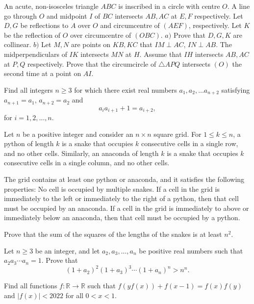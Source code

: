 \documentclass[11pt]{scrartcl}
\begin{document}
\begin{problem}[796349431725149]
An acute, non-isosceles triangle $ABC$ is inscribed in a circle with centre $O$. A line go through $O$ and midpoint $I$ of $BC$ intersects $AB, AC$ at $E, F$ respectively. Let $D, G$ be reflections to $A$ over $O$ and circumcentre of $(AEF)$, respectively. Let $K$ be the reflection of $O$ over circumcentre of $(OBC)$.
$a)$ Prove that $D, G, K$ are collinear.
$b)$ Let $M, N$ are points on $KB, KC$ that $IM\perp AC$, $IN\perp AB$. The midperpendiculars of $IK$ intersects $MN$ at $H$. Assume that $IH$ intersects $AB, AC$ at $P, Q$ respectively. Prove that the circumcircle of $\triangle APQ$ intersects $(O)$ the second time at a point on $AI$.
\end{problem}
\begin{problem}[574223786384294]
Find all integers $n \geq 3$ for which there exist real numbers $a_1, a_2, \dots a_{n + 2}$ satisfying $a_{n + 1} = a_1$, $a_{n + 2} = a_2$ and
$$a_ia_{i + 1} + 1 = a_{i + 2},$$for $i = 1, 2, \dots, n$.
\end{problem}
\begin{problem}[8592236630142322398]
	Let \(n\) be a positive integer and consider an \(n\times n\) square grid. For \(1\le k\le n\), a python of length \(k\) is a snake that occupies \(k\) consecutive cells in a single row, and no other cells. Similarly, an anaconda of length \(k\) is a snake that occupies \(k\) consecutive cells in a single column, and no other cells.

The grid contains at least one python or anaconda, and it satisfies the following properties:
No cell is occupied by multiple snakes.
If a cell in the grid is immediately to the left or immediately to the right of a python, then that cell must be occupied by an anaconda.
If a cell in the grid is immediately to above or immediately below an anaconda, then that cell must be occupied by a python.

Prove that the sum of the squares of the lengths of the snakes is at least \(n^2\).
\end{problem}
\begin{problem}[920619320023657807]
Let $n\ge 3$ be an integer, and let $a_2,a_3,\ldots ,a_n$ be positive real numbers such that $a_{2}a_{3}\cdots a_{n}=1$. Prove that
\[(1 + a_2)^2 (1 + a_3)^3 \dotsm (1 + a_n)^n > n^n.\]
\end{problem}
\begin{problem}[7016087217872166929]
Find all functions $f: \mathbb{R} \rightarrow \mathbb{R}$ such that $f(yf(x))+f(x-1)=f(x)f(y)$ and $|f(x)|<2022$ for all $0<x<1$.
\end{problem}
\end{document}
